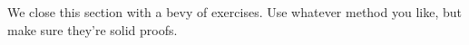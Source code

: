 
 


We close this section with a bevy of exercises. Use whatever method you like, but make sure they're solid proofs.


